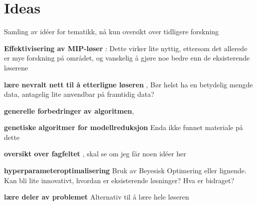 \chapter{Ideas}\label{sec:a-section}

Samling av idéer for tematikk, nå kun oversikt over tidligere forskning

\textbf{Effektivisering av MIP-løser} \textcite{khalil2016learning}:
Dette virker lite nyttig, ettersom det allerede er mye forskning på området, og vanskelig å gjøre noe bedre enn de eksisterende løserene


\textbf{lære nevralt nett til å etterligne løseren} \textcite{bertsimas2019online}, \textcite{lin2019approximate} Bør helst ha en betydelig mengde data, antagelig lite anvendbar på framtidig data?

\textbf{generelle forbedringer av algoritmen}, \textcite{xavier2019learning}


\textbf{genetiske algoritmer for modellreduksjon}
Enda ikke funnet materiale på dette

\textbf{oversikt over fagfeltet} \textcite{bengio2020machine}, skal se om jeg får noen idéer her

\textbf{hyperparameteroptimalisering} \textcite{Hutter2010automated} Bruk av Beyesisk Optimering eller lignende. Kan bli lite innovativt, hvordan er eksisterende løsninger? Hva er bidraget?

\textbf{lære deler av problemet} \textcite{mossina2019multi}
Alternativ til å lære hele løseren
